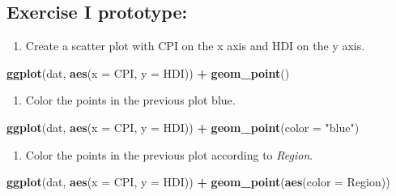 \documentclass[]{book}
\newenvironment{Shaded}{\begin{snugshade}}{\end{snugshade}}
\newcommand{\KeywordTok}[1]{\textcolor[rgb]{0.13,0.29,0.53}{\textbf{#1}}}
\newcommand{\DataTypeTok}[1]{\textcolor[rgb]{0.13,0.29,0.53}{#1}}
\newcommand{\StringTok}[1]{\textcolor[rgb]{0.31,0.60,0.02}{#1}}
\newcommand{\OperatorTok}[1]{\textcolor[rgb]{0.81,0.36,0.00}{\textbf{#1}}}
\newcommand{\NormalTok}[1]{#1}
\providecommand{\tightlist}{%
  \setlength{\itemsep}{0pt}\setlength{\parskip}{0pt}}
\begin{document}
\subsection{Exercise I prototype:}\label{exercise-i-prototype}

\begin{enumerate}
\def\labelenumi{\arabic{enumi}.}
\tightlist
\item
  Create a scatter plot with CPI on the x axis and HDI on the y axis.
\end{enumerate}

\begin{Shaded}
\begin{Highlighting}[]
\KeywordTok{ggplot}\NormalTok{(dat, }\KeywordTok{aes}\NormalTok{(}\DataTypeTok{x =}\NormalTok{ CPI, }\DataTypeTok{y =}\NormalTok{ HDI)) }\OperatorTok{+}
\StringTok{  }\KeywordTok{geom_point}\NormalTok{()}
\end{Highlighting}
\end{Shaded}

\begin{enumerate}
\def\labelenumi{\arabic{enumi}.}
\setcounter{enumi}{1}
\tightlist
\item
  Color the points in the previous plot blue.
\end{enumerate}

\begin{Shaded}
\begin{Highlighting}[]
\KeywordTok{ggplot}\NormalTok{(dat, }\KeywordTok{aes}\NormalTok{(}\DataTypeTok{x =}\NormalTok{ CPI, }\DataTypeTok{y =}\NormalTok{ HDI)) }\OperatorTok{+}
\StringTok{  }\KeywordTok{geom_point}\NormalTok{(}\DataTypeTok{color =} \StringTok{"blue"}\NormalTok{)}
\end{Highlighting}
\end{Shaded}

\begin{enumerate}
\def\labelenumi{\arabic{enumi}.}
\setcounter{enumi}{2}
\tightlist
\item
  Color the points in the previous plot according to \emph{Region}.
\end{enumerate}

\begin{Shaded}
\begin{Highlighting}[]
\KeywordTok{ggplot}\NormalTok{(dat, }\KeywordTok{aes}\NormalTok{(}\DataTypeTok{x =}\NormalTok{ CPI, }\DataTypeTok{y =}\NormalTok{ HDI)) }\OperatorTok{+}
\StringTok{  }\KeywordTok{geom_point}\NormalTok{(}\KeywordTok{aes}\NormalTok{(}\DataTypeTok{color =}\NormalTok{ Region))}
\end{Highlighting}
\end{Shaded}
\end{document}
